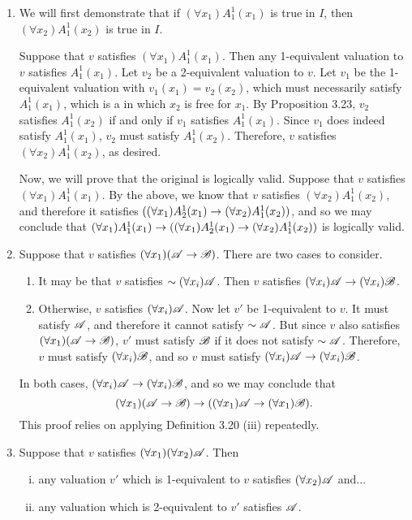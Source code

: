 \begin{enumerate}
\begin{enumerate}[align=left]
      \item We will first demonstrate that if \((\forall x_1)A^1_1(x_1)\) is true in \(I\), then \((\forall x_2)A^1_1(x_2)\) is true in \(I\).

        Suppose that \(v\) satisfies \((\forall x_1)A^1_1(x_1)\). Then any 1-equivalent valuation to \(v\) satisfies \(A^1_1(x_1)\). Let \(v_2\) be a 2-equivalent valuation to \(v\). Let \(v_1\) be the 1-equivalent valuation with \(v_1(x_1) = v_2(x_2)\), which must necessarily satisfy \(A^1_1(x_1)\), which is a \wf{} in which \(x_2\) is free for \(x_1\). By Proposition 3.23, \(v_2\) satisfies \(A^1_1(x_2)\) if and only if \(v_1\) satisfies \(A^1_1(x_1)\). Since \(v_1\) does indeed satisfy \(A^1_1(x_1)\), \(v_2\) must satisfy \(A^1_1(x_2)\). Therefore, \(v\) satisfies \((\forall x_2) A^1_1(x_2)\), as desired.

        Now, we will prove that the original \wf{} is logically valid. Suppose that \(v\) satisfies \((\forall x_1)A^1_1(x_1)\). By the above, we know that \(v\) satisfies \((\forall x_2)A^1_1(x_2)\), and therefore it satisfies \(((\forall x_1)A^1_2(x_1) \rightarrow (\forall x_2)A^1_1(x_2))\), and so we may conclude that \((\forall x_1)A^1_1(x_1) \rightarrow ((\forall x_1)A^1_2(x_1) \rightarrow (\forall x_2)A^1_1(x_2))\) is logically valid.

      \item Suppose that \(v\) satisfies \((\forall x_1) (\mathscr{A} \rightarrow \mathscr{B})\). There are two cases to consider.
        \begin{enumerate}
          \item It may be that \(v\) satisfies \(\sim(\forall x_i)\mathscr{A}\). Then \(v\) satisfies \((\forall x_i) \mathscr{A} \rightarrow (\forall x_i) \mathscr{B}\).
          \item Otherwise, \(v\) satisfies \((\forall x_i)\mathscr{A}\). Now let \(v'\) be 1-equivalent to \(v\). It must satisfy \(\mathscr{A}\), and therefore it cannot satisfy \(\sim\mathscr{A}\). But since \(v\) also satisfies \((\forall x_1) (\mathscr{A} \rightarrow \mathscr{B})\), \(v'\) must satisfy \(\mathscr{B}\) if it does not satisfy \(\sim\mathscr{A}\). Therefore, \(v\) must satisfy \((\forall x_i) \mathscr{B}\), and so \(v\) must satisfy \((\forall x_i) \mathscr{A} \rightarrow (\forall x_i) \mathscr{B}\).
        \end{enumerate}
        In both cases, \((\forall x_i) \mathscr{A} \rightarrow (\forall x_i) \mathscr{B}\), and so we may conclude that
        \[(\forall x_1)(\mathscr{A} \rightarrow \mathscr{B}) \rightarrow ((\forall x_1)\mathscr{A} \rightarrow (\forall x_1)\mathscr{B}).\]
        \note{} This proof relies on applying Definition 3.20 (iii) repeatedly.

      \item Suppose that \(v\) satisfies \((\forall x_1)(\forall x_2)\mathscr{A}\). Then
        \begin{enumerate}[(i)]
          \item any valuation \(v'\) which is 1-equivalent to \(v\) satisfies \((\forall x_2)\mathscr{A}\) and...
          \item any valuation which is 2-equivalent to \(v'\) satisfies \(\mathscr{A}\).
        \end{enumerate}


\end{enumerate}
\end{enumerate}
